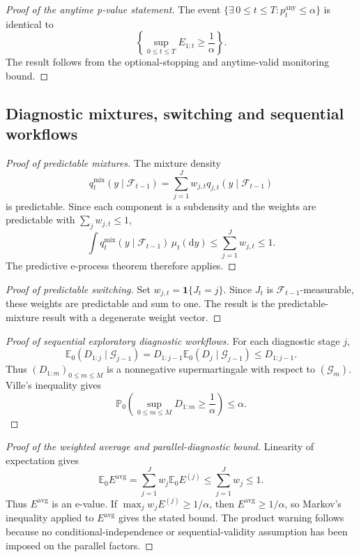 \documentclass[pdflatex,sn-basic]{sn-jnl}
\newcommand{\E}{\mathbb E}
\newcommand{\Pbb}{\mathbb P}
\newcommand{\1}{\mathbf 1}
\newcommand{\calF}{\mathcal F}
\newcommand{\calG}{\mathcal G}
\begin{document}
\begin{proof}[Proof of the anytime p-value statement]
The event $\{\exists\,0\leq t\leq T:p_t^{\mathrm{any}}\leq\alpha\}$ is identical to
\[
 \left\{\sup_{0\leq t\leq T}E_{1:t}\geq\frac{1}{\alpha}\right\}.
\]
The result follows from the optional-stopping and anytime-valid monitoring bound.
\end{proof}

\subsection{Diagnostic mixtures, switching and sequential workflows}

\begin{proof}[Proof of predictable mixtures]
The mixture density
\[
q_t^{\mathrm{mix}}(y\mid\calF_{t-1})=\sum_{j=1}^Jw_{j,t}q_{j,t}(y\mid\calF_{t-1})
\]
is predictable. Since each component is a subdensity and the weights are predictable with $\sum_jw_{j,t}\leq1$,
\[
\int q_t^{\mathrm{mix}}(y\mid\calF_{t-1})\,\mu_t(\mathrm dy)
\leq \sum_{j=1}^Jw_{j,t}\leq1.
\]
The predictive e-process theorem therefore applies.
\end{proof}

\begin{proof}[Proof of predictable switching]
Set $w_{j,t}=\1\{J_t=j\}$. Since $J_t$ is $\calF_{t-1}$-measurable, these weights are predictable and sum to one. The result is the predictable-mixture result with a degenerate weight vector.
\end{proof}

\begin{proof}[Proof of sequential exploratory diagnostic workflows]
For each diagnostic stage $j$,
\[
 \E_0(D_{1:j}\mid\calG_{j-1})
 =D_{1:j-1}\E_0(D_j\mid\calG_{j-1})
 \leq D_{1:j-1}.
\]
Thus $(D_{1:m})_{0\leq m\leq M}$ is a nonnegative supermartingale with respect to $(\calG_m)$. Ville's inequality gives
\[
 \Pbb_0\left(\sup_{0\leq m\leq M}D_{1:m}\geq\frac{1}{\alpha}\right)\leq\alpha.
\]
\end{proof}

\begin{proof}[Proof of the weighted average and parallel-diagnostic bound]
Linearity of expectation gives
\[
\E_0E^{\mathrm{avg}}
=\sum_{j=1}^Jw_j\E_0E^{(j)}
\leq \sum_{j=1}^Jw_j\leq1.
\]
Thus $E^{\mathrm{avg}}$ is an e-value. If $\max_j w_jE^{(j)}\geq1/\alpha$, then $E^{\mathrm{avg}}\geq1/\alpha$, so Markov's inequality applied to $E^{\mathrm{avg}}$ gives the stated bound. The product warning follows because no conditional-independence or sequential-validity assumption has been imposed on the parallel factors.
\end{proof}
\end{document}
